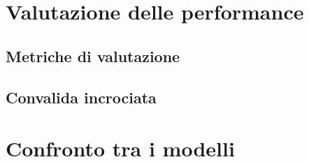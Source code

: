 \label{chap:valutazioni}

%

\section{Valutazione delle performance}
\subsection{Metriche di valutazione}


\subsection{Convalida incrociata}
\section{Confronto tra i modelli}





